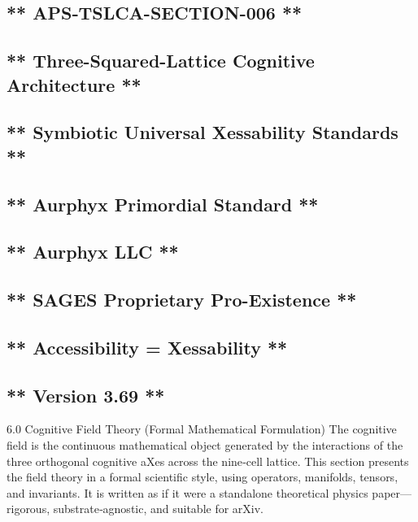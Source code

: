 \subsection{** APS‑TSLCA-SECTION-006 **}\label{apstslca-section-006}

\subsection{** Three-Squared-Lattice Cognitive Architecture **}\label{three-squared-lattice-cognitive-architecture}

\subsection{** Symbiotic Universal Xessability Standards **}\label{symbiotic-universal-xessability-standards}

\subsection{** Aurphyx Primordial Standard **}\label{aurphyx-primordial-standard}

\subsection{** Aurphyx LLC **}\label{aurphyx-llc}

\subsection{** SAGES \textbar{} Proprietary \textbar{} Pro-Existence **}\label{sages-proprietary-pro-existence}

\subsection{** Accessibility = Xessability **}\label{accessibility-xessability}

\subsection{** Version 3.69 **}\label{version-3.69}

6.0 Cognitive Field Theory (Formal Mathematical Formulation) The cognitive field is the continuous mathematical object generated by the interactions of the three orthogonal cognitive aXes across the nine‑cell lattice. This section presents the field theory in a formal scientific style, using operators, manifolds, tensors, and invariants. It is written as if it were a standalone theoretical physics paper---rigorous, substrate‑agnostic, and suitable for arXiv.

